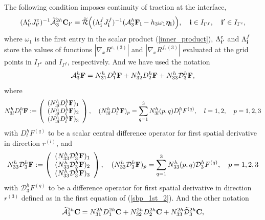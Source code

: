 The following condition imposes continuity of traction at the interface,
\begin{equation}\label{continuous_traction}
(\Lambda^{c}_{{\bf i}'}J_{{\bf i}'}^{c})^{-1}\wt{\mathcal{A}}_3^{2h}{\bf C}_{{\bf i}'}
= \wt{\mathcal{R}}\Big((\Lambda^f_{\bf i}{ J}^f_{\bf i})^{-1}(\mathcal{A}_3^h{\bf F}_{\bf i}-h_3\omega_1{\bm \eta}_{\bf i})\Big), \quad {\bf i}\in I_{\Gamma^f},\quad {{\bf i}'}\in I_{\Gamma^c},
\end{equation}
where $\omega_1$ is the first entry in the scalar product (\ref{inner_product}), $\Lambda_{{\bf i}'}^c$ and $\Lambda_{\bf i}^f$ store the values of functions $|\nabla_x R^{c,(3)}|$ and $|\nabla_x R^{f,(3)}|$ evaluated at the grid points in $I_{\Gamma^c}$ and $I_{\Gamma^f}$, respectively. And we have used the notation
\begin{equation}\label{hatAf}
\mathcal{A}_3^h{\bf F} = {N}_{31}^{h}{D}^h_1{\bf F} + {N}_{32}^h{D}^h_2{\bf F} + {N}_{33}^h\mathcal{D}_3^h{\bf F},
\end{equation}
where
\begin{align}\label{gamma_D}
{N}_{3l}^hD_l^h{\bf F} := \left(\begin{array}{c}
({N}_{3l}^hD_l^h{\bf F})_1 \\
({N}_{3l}^hD_l^h{\bf F})_2 \\
({N}_{3l}^hD_l^h{\bf F})_3 
\end{array}\right), \quad ({N}_{3l}^hD_l^h{\bf F})_p = \sum_{q = 1}^{3} N_{3l}^h(p,q)D_l^h{F}^{(q)},\quad l = 1,2, \quad p = 1,2,3
\end{align}
with $D_l^h{F}^{(q)}$ to be a scalar central difference operator for first spatial derivative in direction $r^{(l)}$, and
\begin{align*}
{N}_{33}^h\mathcal{D}_3^h{\bf F} := \left(\begin{array}{c}
({N}_{33}^h\mathcal{D}_3^h{\bf F})_1 \\
({N}_{33}^h\mathcal{D}_3^h{\bf F})_2 \\
({N}_{33}^h\mathcal{D}_3^h{\bf F})_3 
\end{array}\right), \quad ({N}_{33}^h\mathcal{D}_3^h{\bf F})_p = \sum_{q = 1}^{3} N_{33}^h(p,q)\mathcal{D}_3^h{F}^{(q)},\quad p = 1,2,3
\end{align*}
with $\mathcal{D}_3^h{F}^{(q)}$ to be a difference operator for first spatial derivative in direction $r^{(3)}$ defined as in the first equation of (\ref{sbp_1st_2}). And the other notation 
\begin{equation}\label{hatAc}
\wt{\mathcal{A}}_3^{2h}{\bf C} = {N}_{31}^{2h}{D}^{2h}_1{\bf C} + {N}_{32}^{2h}{D}^{2h}_2{\bf C} + {N}_{33}^{2h}\wt{\mathcal{D}}^{2h}_3{\bf C},
\end{equation}
